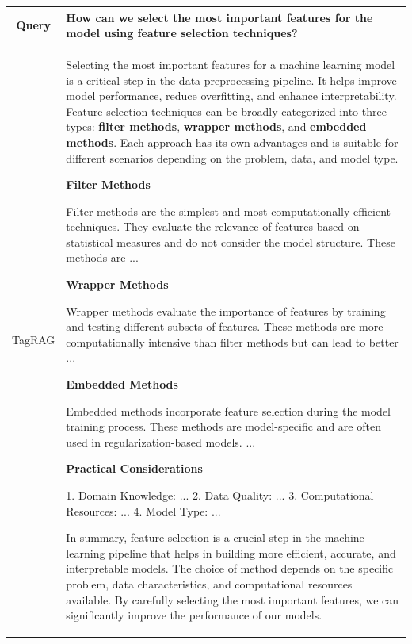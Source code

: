 \documentclass[11pt]{article}
\begin{document}
\begin{table}[h]
\small
\begin{tabularx}{\textwidth}{p{2cm}|X}
    \toprule
    \multicolumn{1}{c|}{Query} & How can we select the most important features for the model using feature selection techniques? \\
    \hline
    
    \multicolumn{1}{c|}{TagRAG} & Selecting the most important features for a machine learning model is a critical step in the data preprocessing pipeline. It helps improve model performance, reduce overfitting, and enhance interpretability. Feature selection techniques can be broadly categorized into three types: \textbf{filter methods}, \textbf{wrapper methods}, and \textbf{embedded methods}. Each approach has its own advantages and is suitable for different scenarios depending on the problem, data, and model type. 
    
    \textbf{Filter Methods}

    Filter methods are the simplest and most computationally efficient techniques. They evaluate the relevance of features based on statistical measures and do not consider the model structure. These methods are ...
    
    \textbf{Wrapper Methods}
    
    Wrapper methods evaluate the importance of features by training and testing different subsets of features. These methods are more computationally intensive than filter methods but can lead to better ...
    
    \textbf{Embedded Methods}
    
    Embedded methods incorporate feature selection during the model training process. These methods are model-specific and are often used in regularization-based models. ...
    
    \textbf{Practical Considerations}
    
    1. Domain Knowledge: ... 2. Data Quality: ... 3. Computational Resources: ... 4. Model Type: ...
    
    In summary, feature selection is a crucial step in the machine learning pipeline that helps in building more efficient, accurate, and interpretable models. The choice of method depends on the specific problem, data characteristics, and computational resources available. By carefully selecting the most important features, we can significantly improve the performance of our models. \\
    

\end{tabularx}
\end{table}
\end{document}
